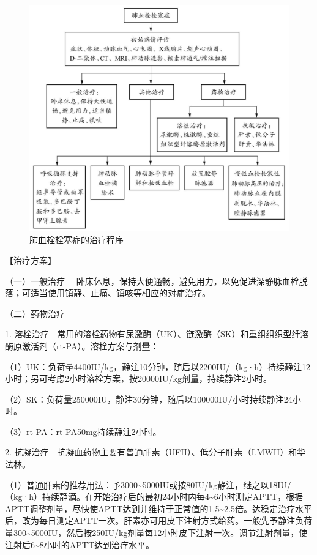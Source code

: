 \begin{figure}[!htbp]
 \centering
 \includegraphics{./images/Image00022.jpg}
 \captionsetup{justification=centering}
 \caption{肺血栓栓塞症的治疗程序}
 \label{fig1-10-1}
  \end{figure} 

【治疗方案】

{（一）一般治疗}
　卧床休息，保持大便通畅，避免用力，以免促进深静脉血栓脱落；可适当使用镇静、止痛、镇咳等相应的对症治疗。

{（二）药物治疗}

1.
溶栓治疗　常用的溶栓药物有尿激酶（UK）、链激酶（SK）和重组组织型纤溶酶原激活剂（rt-PA）。溶栓方案与剂量：

（1）UK：负荷量4400IU/kg，静注10分钟，随后以2200IU/（kg·h）持续静注12小时；另可考虑2小时溶栓方案，按20000IU/kg剂量，持续静注2小时。

（2）SK：负荷量250000IU，静注30分钟，随后以100000IU/小时持续静注24小时。

（3）rt-PA：rt-PA50mg持续静注2小时。

2.
抗凝治疗　抗凝血药物主要有普通肝素（UFH）、低分子肝素（LMWH）和华法林。

（1）普通肝素的推荐用法：予3000\textasciitilde{}5000IU或按80IU/kg静注，继之以18IU/（kg·h）持续静滴。在开始治疗后的最初24小时内每4\textasciitilde{}6小时测定APTT，根据APTT调整剂量，尽快使APTT达到并维持于正常值的1.5\textasciitilde{}2.5倍。达稳定治疗水平后，改为每日测定APTT一次。肝素亦可用皮下注射方式给药。一般先予静注负荷量300\textasciitilde{}5000IU，然后按250IU/kg剂量每12小时皮下注射一次。调节注射剂量，使注射后6\textasciitilde{}8小时的APTT达到治疗水平。

